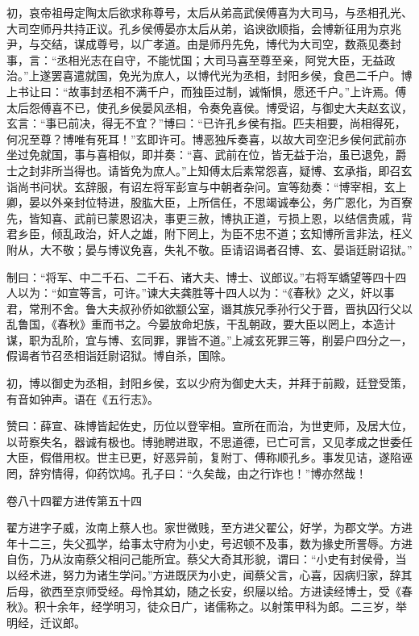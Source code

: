\documentclass[12pt,UTF8]{ctexbook}
\begin{document}
初，哀帝祖母定陶太后欲求称尊号，太后从弟高武侯傅喜为大司马，与丞相孔光、大司空师丹共持正议。孔乡侯傅晏亦太后从弟，谄谀欲顺指，会博新征用为京兆尹，与交结，谋成尊号，以广孝道。由是师丹先免，博代为大司空，数燕见奏封事，言：“丞相光志在自守，不能忧国；大司马喜至尊至亲，阿党大臣，无益政治。”上遂罢喜遣就国，免光为庶人，以博代光为丞相，封阳乡侯，食邑二千户。博上书让曰：“故事封丞相不满千户，而独臣过制，诚惭惧，愿还千户。”上许焉。傅太后怨傅喜不已，使孔乡侯晏风丞相，令奏免喜侯。博受诏，与御史大夫赵玄议，玄言：“事已前决，得无不宜？”博曰：“已许孔乡侯有指。匹夫相要，尚相得死，何况至尊？博唯有死耳！”玄即许可。博恶独斥奏喜，以故大司空汜乡侯何武前亦坐过免就国，事与喜相似，即并奏：“喜、武前在位，皆无益于治，虽已退免，爵士之封非所当得也。请皆免为庶人。”上知傅太后素常怨喜，疑博、玄承指，即召玄诣尚书问状。玄辞服，有诏左将军彭宣与中朝者杂问。宣等劾奏：“博宰相，玄上卿，晏以外亲封位特进，股肱大臣，上所信任，不思竭诚奉公，务广恩化，为百寮先，皆知喜、武前已蒙恩诏决，事更三赦，博执正道，亏损上恩，以结信贵戚，背君乡臣，倾乱政治，奸人之雄，附下罔上，为臣不忠不道；玄知博所言非法，枉义附从，大不敬；晏与博议免喜，失礼不敬。臣请诏谒者召博、玄、晏诣廷尉诏狱。”



制曰：“将军、中二千石、二千石、诸大夫、博士、议郎议。”右将军蟜望等四十四人以为：“如宣等言，可许。”谏大夫龚胜等十四人以为：“《春秋》之义，奸以事君，常刑不舍。鲁大夫叔孙侨如欲颛公室，谮其族兄季孙行父于晋，晋执囚行父以乱鲁国，《春秋》重而书之。今晏放命圯族，干乱朝政，要大臣以罔上，本造计谋，职为乱阶，宜与博、玄同罪，罪皆不道。”上减玄死罪三等，削晏户四分之一，假谒者节召丞相诣廷尉诏狱。博自杀，国除。



初，博以御史为丞相，封阳乡侯，玄以少府为御史大夫，并拜于前殿，廷登受策，有音如钟声。语在《五行志》。



赞曰：薛宣、硃博皆起佐史，历位以登宰相。宣所在而治，为世吏师，及居大位，以苛察失名，器诚有极也。博驰聘进取，不思道德，已亡可言，又见孝成之世委任大臣，假借用权。世主已更，好恶异前，复附丁、傅称顺孔乡。事发见诘，遂陷诬罔，辞穷情得，仰药饮鸠。孔子曰：“久矣哉，由之行诈也！”博亦然哉！





卷八十四翟方进传第五十四



翟方进字子威，汝南上蔡人也。家世微贱，至方进父翟公，好学，为郡文学。方进年十二三，失父孤学，给事太守府为小史，号迟顿不及事，数为掾史所詈辱。方进自伤，乃从汝南蔡父相问己能所宜。蔡父大奇其形貌，谓曰：“小史有封侯骨，当以经术进，努力为诸生学问。”方进既厌为小史，闻蔡父言，心喜，因病归家，辞其后母，欲西至京师受经。母怜其幼，随之长安，织屦以给。方进读经博士，受《春秋》。积十余年，经学明习，徒众日广，诸儒称之。以射策甲科为郎。二三岁，举明经，迁议郎。
\end{document}
